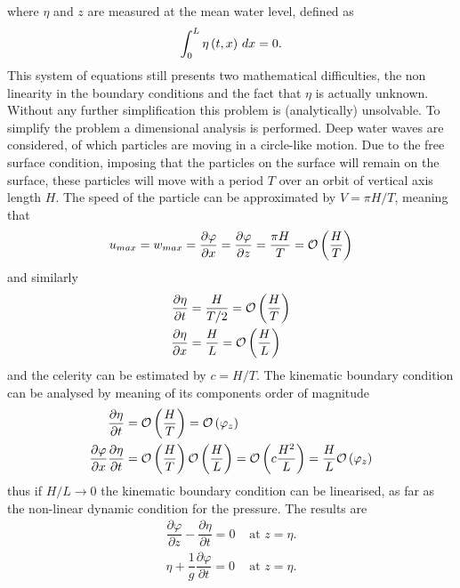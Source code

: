 where $\eta$ and $z$ are measured at the mean water level, defined as 
\begin{equation}
\int_{0}^{L}\eta\left( t,x \right)\,dx=0.
\end{equation}
This system of equations still presents two mathematical difficulties, the non linearity in the boundary conditions and the fact that $\eta$ is actually unknown. Without any further simplification this problem is (analytically) unsolvable. To simplify the problem a dimensional analysis is performed. Deep water waves are considered, of which particles are moving in a circle-like motion. Due to the free surface condition, imposing that the particles on the surface will remain on the surface, these particles will move with a period $T$ over an orbit of vertical axis length $H$. The speed of the particle can be approximated by $V=\pi H/T$, meaning that 
\begin{equation*}
u_{max}=w_{max}=\dfrac{\partial\varphi}{\partial x}=\dfrac{\partial\varphi}{\partial z}=\dfrac{\pi H}{T}=\mathcal{O}\left( \dfrac{H}{T} \right)
\end{equation*}
and similarly
\begin{align*}
\dfrac{\partial\eta}{\partial t}&=\dfrac{H}{T/2}=\mathcal{O}\left( \dfrac{H}{T} \right) \\
\dfrac{\partial\eta}{\partial x}&=\dfrac{H}{L}=\mathcal{O}\left( \dfrac{H}{L} \right)
\end{align*}
and the celerity can be estimated by $c=H/T$. The kinematic boundary condition can be analysed by meaning of its components order of magnitude
\begin{align*}
\dfrac{\partial\eta}{\partial t}&=\mathcal{O}\left( \dfrac{H}{T} \right)=\mathcal{O}\left( \varphi_{z} \right) \\
\dfrac{\partial\varphi}{\partial x}\dfrac{\partial\eta}{\partial t}&=\mathcal{O}\left( \dfrac{H}{T} \right)\mathcal{O}\left( \dfrac{H}{L} \right)=\mathcal{O}\left( c\dfrac{H^{2}}{L} \right)=\dfrac{H}{L}\mathcal{O}\left( \varphi_{z} \right) \\
\end{align*}
thus if $H/L\rightarrow 0$ the kinematic boundary condition can be linearised, as far as the non-linear dynamic condition for the pressure. The results are
\renewcommand{\arraystretch}{2.5}
\begin{equation*}
\begin{array}{ll}
\dfrac{\partial\varphi}{\partial z}-\dfrac{\partial\eta}{\partial t}=0  & \text{ at } z=\eta. \\
\eta + \dfrac{1}{g}\dfrac{\partial \varphi}{\partial t}=0 & \text{ at } z=\eta.
\end{array}
\end{equation*}
